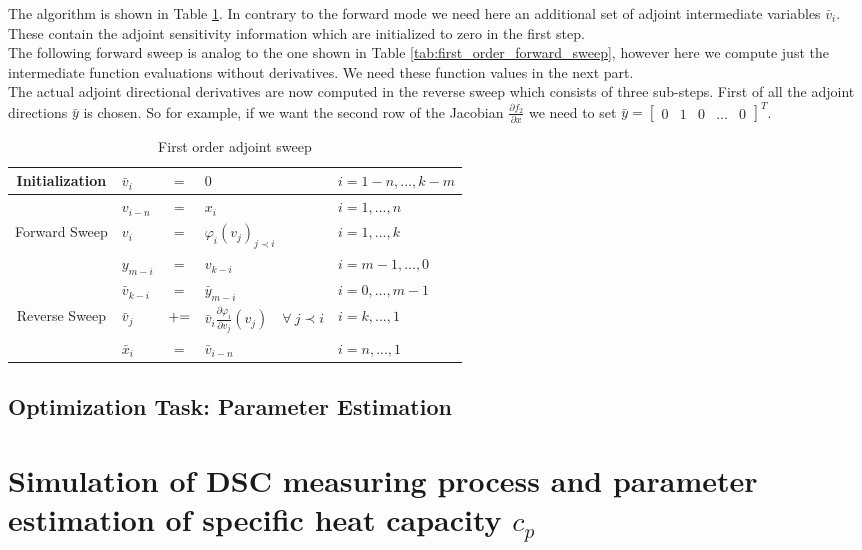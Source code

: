 \documentclass{scrartcl}[12pt, halfparskip]
\begin{document}
The algorithm is shown in Table \ref{tab:first_order_adjoint_sweep}. In contrary to the forward mode we need here an additional set of adjoint intermediate variables $\bar{v}_i$. These contain the adjoint sensitivity information which are initialized to zero in the first step. \\
The following forward sweep is analog to the one shown in Table \ref{tab:first_order_forward_sweep}, however here we compute just the intermediate function evaluations without derivatives. We need these function values in the next part. \\
The actual adjoint directional derivatives are now computed in the reverse sweep which consists of three sub-steps. First of all the adjoint directions $\bar{y}$ is chosen. So for example, if we want the second row of the Jacobian $\frac{\partial f_2}{\partial x}$ we need to set $\bar{y} = \begin{bmatrix}
0 & 1 & 0 & \dots & 0
\end{bmatrix}^T$.


\begin{table}[H]
\begin{tabular}{| c | l c l | l |} \hline
	Initialization & $\bar{v}_i$ & $=$ & $0$ & $i=1-n,...,k-m$ \\ \hline
	& $v_{i-n}$ & $=$ & $x_i$ & $i=1,...,n$ \\
	Forward Sweep & $v_{i}$ & $=$ & $\varphi_i(v_j)_{j \prec i}$ & $i=1,...,k$ \\
	& $y_{m-i}$ & $=$ & $v_{k-i}$ & $i=m-1,...,0$ \\ \hline
	& $\bar{v}_{k-i}$ & $=$ & $\bar{y}_{m-i}$ & $i=0,...,m-1$ \\
	Reverse Sweep & $\bar{v}_j$ & $+ \hspace{-0.1cm} =$ & $\bar{v}_i \frac{\partial \varphi_i}{\partial v_j}(v_j) \quad \forall \ j \prec i$ & $i=k,...,1$ \\
	& $\bar{x}_i$ & $=$ & $\bar{v}_{i-n}$ & $i=n,...,1$ \\ \hline
\end{tabular}
\caption{First order adjoint sweep}
\label{tab:first_order_adjoint_sweep}
\end{table}




\subsection{Optimization Task: Parameter Estimation}


\newpage
\section{Simulation of DSC measuring process and parameter estimation of specific heat capacity $c_p$}
\end{document}
